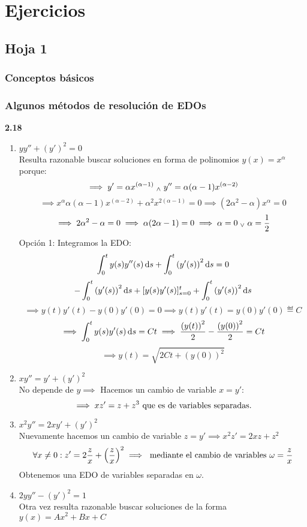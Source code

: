 \section{Ejercicios}

\subsection{Hoja 1}

\subsubsection{Conceptos básicos}

\subsubsection{Algunos métodos de resolución de EDOs}
\textbf{2.18} \begin{enumerate}
	\item $yy'' + (y')^2=0$ \\
	Resulta razonable buscar soluciones en forma de polinomios $y(x)=x^\alpha$ porque:
	\[\implies y'=\alpha x ^{(\alpha-1)} \; _{\wedge} \; y''=\alpha(\alpha-1)x^{(\alpha-2)}\]
	\[\implies x^{\alpha}\alpha(\alpha-1)x^{(\alpha-2)} + \alpha^2 x ^{2(\alpha-1)} = 0\implies (2\alpha^2-\alpha)x^\alpha=0\]
	\[\implies 2\alpha^2-\alpha=0 \implies \alpha(2\alpha-1)=0 \implies \alpha=0 \; _{\vee} \; \alpha=\frac{1}{2}\]
	Opción 1: Integramos la EDO:
	\[\int_{0}^{t} y(s) y''(s)\odif{s} + \int_{0}^{t} {(y'(s))}^2 \odif{s} = 0\]
	\[-\int_{0}^t {(y'(s))}^2 \odif{s} + [y(s)y'(s)]^t_{s=0} + \int_{0}^{t} {(y'(s))}^2 \odif{s}\]
	\[\implies y(t)y'(t)-y(0)y'(0)=0 \implies y(t)y'(t)=y(0)y'(0)\eqdef C\]
	\[\implies \int_{0}^{t} y(s)y'(s)\odif{s}=Ct \implies \frac{{(y(t))}^2}{2}  -\frac{{(y(0))}^2}{2}=Ct\]
	\[\implies y(t)=\sqrt{2Ct+(y(0))^2}\]
	\item $xy''=y'+(y')^2$ \\
	No depende de $y \implies$ Hacemos un cambio de variable $x=y'$:
	\[\implies xz'=z+z^3 \text{ que es de variables separadas.}\]
	\item $x^2y''=2xy'+(y')^2$ \\
	Nuevamente hacemos un cambio de variable $z=y' \implies x^2z'=2xz+z^2$
	\[\forall x \ne 0 : z'=2\frac{z}{x} + \left(\frac{z}{x}\right)^2 \implies \text{ mediante el cambio de variables } \omega = \frac{z}{x}\]
	Obtenemos una EDO de variables separadas en $\omega$.
	\item $2yy''-(y')^2=1$ \\
	Otra vez resulta razonable buscar soluciones de la forma $y(x)=Ax^2 + Bx +C$
\end{enumerate}

